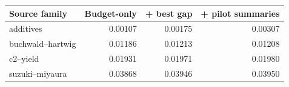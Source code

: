 \begin{tabular}{lrrr}
\toprule
Source family & Budget-only & + best gap & + pilot summaries\\
\midrule
additives & 0.00107 & 0.00175 & 0.00307\\
buchwald--hartwig & 0.01186 & 0.01213 & 0.01208\\
c2--yield & 0.01931 & 0.01971 & 0.01980\\
suzuki--miyaura & 0.03868 & 0.03946 & 0.03950\\
\bottomrule
\end{tabular}
